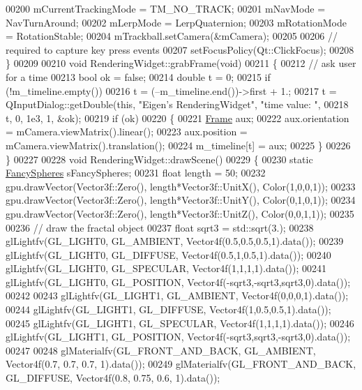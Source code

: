 \begin{DoxyCode}
00200   mCurrentTrackingMode = TM\_NO\_TRACK;
00201   mNavMode = NavTurnAround;
00202   mLerpMode = LerpQuaternion;
00203   mRotationMode = RotationStable;
00204   mTrackball.setCamera(&mCamera);
00205 
00206   \textcolor{comment}{// required to capture key press events}
00207   setFocusPolicy(Qt::ClickFocus);
00208 \}
00209 
00210 \textcolor{keywordtype}{void} RenderingWidget::grabFrame(\textcolor{keywordtype}{void})
00211 \{
00212     \textcolor{comment}{// ask user for a time}
00213     \textcolor{keywordtype}{bool} ok = \textcolor{keyword}{false};
00214     \textcolor{keywordtype}{double} t = 0;
00215     \textcolor{keywordflow}{if} (!m\_timeline.empty())
00216       t = (--m\_timeline.end())->first + 1.;
00217     t = QInputDialog::getDouble(\textcolor{keyword}{this}, \textcolor{stringliteral}{"Eigen's RenderingWidget"}, \textcolor{stringliteral}{"time value: "},
00218       t, 0, 1e3, 1, &ok);
00219     \textcolor{keywordflow}{if} (ok)
00220     \{
00221       \hyperlink{class_frame}{Frame} aux;
00222       aux.orientation = mCamera.viewMatrix().linear();
00223       aux.position = mCamera.viewMatrix().translation();
00224       m\_timeline[t] = aux;
00225     \}
00226 \}
00227 
00228 \textcolor{keywordtype}{void} RenderingWidget::drawScene()
00229 \{
00230   \textcolor{keyword}{static} \hyperlink{class_fancy_spheres}{FancySpheres} sFancySpheres;
00231   \textcolor{keywordtype}{float} length = 50;
00232   gpu.drawVector(Vector3f::Zero(), length*Vector3f::UnitX(), Color(1,0,0,1));
00233   gpu.drawVector(Vector3f::Zero(), length*Vector3f::UnitY(), Color(0,1,0,1));
00234   gpu.drawVector(Vector3f::Zero(), length*Vector3f::UnitZ(), Color(0,0,1,1));
00235 
00236   \textcolor{comment}{// draw the fractal object}
00237   \textcolor{keywordtype}{float} sqrt3 = std::sqrt(3.);
00238   glLightfv(GL\_LIGHT0, GL\_AMBIENT, Vector4f(0.5,0.5,0.5,1).data());
00239   glLightfv(GL\_LIGHT0, GL\_DIFFUSE, Vector4f(0.5,1,0.5,1).data());
00240   glLightfv(GL\_LIGHT0, GL\_SPECULAR, Vector4f(1,1,1,1).data());
00241   glLightfv(GL\_LIGHT0, GL\_POSITION, Vector4f(-sqrt3,-sqrt3,sqrt3,0).data());
00242 
00243   glLightfv(GL\_LIGHT1, GL\_AMBIENT, Vector4f(0,0,0,1).data());
00244   glLightfv(GL\_LIGHT1, GL\_DIFFUSE, Vector4f(1,0.5,0.5,1).data());
00245   glLightfv(GL\_LIGHT1, GL\_SPECULAR, Vector4f(1,1,1,1).data());
00246   glLightfv(GL\_LIGHT1, GL\_POSITION, Vector4f(-sqrt3,sqrt3,-sqrt3,0).data());
00247 
00248   glMaterialfv(GL\_FRONT\_AND\_BACK, GL\_AMBIENT, Vector4f(0.7, 0.7, 0.7, 1).data());
00249   glMaterialfv(GL\_FRONT\_AND\_BACK, GL\_DIFFUSE, Vector4f(0.8, 0.75, 0.6, 1).data());

\end{DoxyCode}
